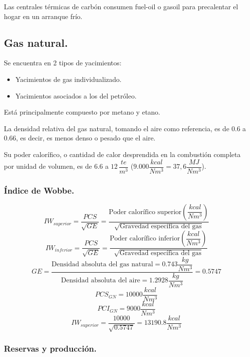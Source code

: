 			
			Las centrales térmicas de carbón consumen fuel-oil o
			gasoil para precalentar el hogar en un arranque frío.
			
	\subsection{Gas natural.}
		Se encuentra en 2 tipos de yacimientos:
		\begin{itemize}
			\item Yacimientos de gas individualizado.
			\item Yacimientos asociados a los del petróleo.
		\end{itemize}
		
		
		Está principalmente compuesto por metano y etano.
		
		
		La densidad relativa del gas natural, tomando el aire
		como referencia, es de 0.6 a 0.66, es decir, es menos
		denso o pesado que el aire.
		
		
		Su poder calorífico, o cantidad de calor desprendida en
		la combustión completa por unidad de volumen, es de
		6.6 a $12\,\dfrac{te}{m^3}$ ($9.000 \dfrac{kcal}{Nm^3} = 37,6 \dfrac{MJ}{Nm^3}$).
		
		\subsubsection{Índice de Wobbe.}
			\[IW_{superior} = \dfrac{PCS}{\sqrt{GE}} = \dfrac{\text{Poder calorífico superior} \left(\dfrac{kcal}{Nm^3}\right)}{\sqrt{\text{Gravedad específica del gas}}}\]
			\[IW_{inferior} = \dfrac{PCS}{\sqrt{GE}} = \dfrac{\text{Poder calorífico inferior} \left(\dfrac{kcal}{Nm^3}\right)}{\sqrt{\text{Gravedad específica del gas}}}\]
			\[GE = \dfrac{\text{Densidad absoluta del gas natural} = 0.743 \dfrac{kg}{Nm^3}}{\text{Densidad absoluta del aire} = 1.2928 \dfrac{kg}{Nm^3}} = 0.5747\]
			\[PCS_{GN} = 10000 \dfrac{kcal}{Nm^3}\]
			\[PCI_{GN} = 9000 \dfrac{kcal}{Nm^3}\]
			\[IW_{superior} = \dfrac{10000}{\sqrt{0.5747}} = 13190.8 \dfrac{kcal}{Nm^3}\]

		\subsubsection{Reservas y producción.}
			\begin{center}
			\end{center}
			
